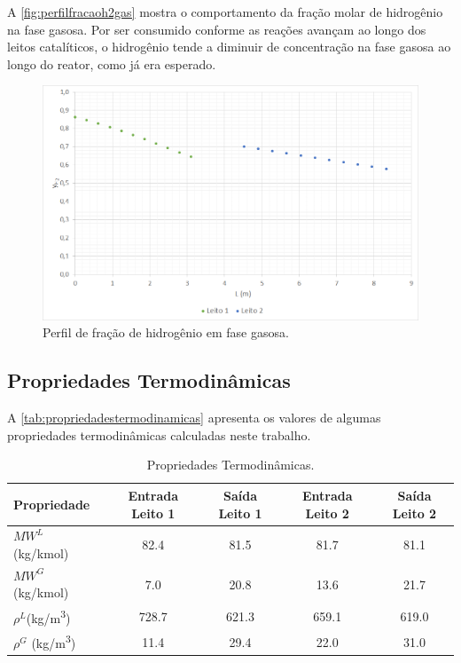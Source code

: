 A \autoref{fig:perfilfracaoh2gas} mostra o comportamento da
fração molar de hidrogênio na fase gasosa. Por ser consumido conforme as reações
avançam ao longo dos leitos catalíticos, o hidrogênio tende a diminuir de
concentração na fase gasosa ao longo do reator, como já era esperado.

\begin{figure}[htb]
\centering
\includegraphics[scale=0.4]{images/Chap4/perfilfracaoh2gas.png}
\caption{Perfil de fração de hidrogênio em fase gasosa.}
\label{fig:perfilfracaoh2gas}
\end{figure}

\subsection{Propriedades Termodinâmicas} \label{propriedadestermodinâmicas}

A \autoref{tab:propriedadestermodinamicas} apresenta os valores de algumas
propriedades termodinâmicas calculadas neste trabalho.

\begin{table}[!htb]
\begin{center}
\caption{Propriedades Termodinâmicas.}
\label{tab:propriedadestermodinamicas}
\small
\begin{tabular}{lcccc}
{Propriedade} & {Entrada Leito 1} & {Saída Leito 1} & {Entrada Leito 2} &
{Saída Leito 2}
\\
\hline
{$MW^{L}$ (\si{kg/kmol})} & \num{82,4} & \num{81,5} & \num{81,7} & \num{81,1} \\
{$MW^{G}$ (\si{kg/kmol})} & \num{7,0} & \num{20,8} & \num{13,6} & \num{21,7} \\
{$\rho^{L}$(\si{kg/m^3})} & \num{728,7} & \num{621,3} & \num{659,1} &
\num{619,0}
\\
{$\rho^{G}$ (\si{kg/m^3})} & \num{11,4} & \num{29,4} & \num{22,0} & \num{31,0}
\\
\bottomrule
\end{tabular}
\end{center}
\end{table}

